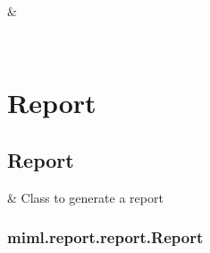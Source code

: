 \documentclass[letterpaper,10pt,english]{sphinxmanual}
\begin{document}
\begin{savenotes}\sphinxattablestart
\sphinxthistablewithglobalstyle
\sphinxthistablewithnovlinesstyle
\centering
\begin{tabulary}{\linewidth}[t]{}
\sphinxtoprule
\sphinxtableatstartofbodyhook
\sphinxAtStartPar
{}
&
\sphinxAtStartPar

\\
\sphinxbottomrule
\end{tabulary}
\sphinxtableafterendhook\par
\sphinxattableend\end{savenotes}

\sphinxstepscope


\chapter{Report}
\label{\detokenize{report/index:report}}\label{\detokenize{report/index::doc}}
\sphinxstepscope


\section{Report}
\label{\detokenize{report/report:report}}\label{\detokenize{report/report::doc}}

\begin{savenotes}\sphinxattablestart
\sphinxthistablewithglobalstyle
\sphinxthistablewithnovlinesstyle
\centering
\begin{tabulary}{\linewidth}[t]{}
\sphinxtoprule
\sphinxtableatstartofbodyhook
\sphinxAtStartPar
{\hyperref[\detokenize{report/_autosummary/miml.report.report.Report:miml.report.report.Report}]{}}
&
\sphinxAtStartPar
Class to generate a report
\\
\sphinxbottomrule
\end{tabulary}
\sphinxtableafterendhook\par
\sphinxattableend\end{savenotes}

\sphinxstepscope


\subsection{miml.report.report.Report}
\label{\detokenize{report/_autosummary/miml.report.report.Report:miml-report-report-report}}\label{\detokenize{report/_autosummary/miml.report.report.Report::doc}}
\end{document}
